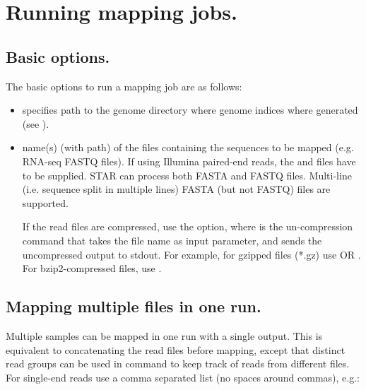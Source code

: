 \documentclass[12pt]{article}
\begin{document}
\section{Running mapping jobs.}\label{Running_mapping_jobs}
\subsection{Basic options.}
The basic options to run a mapping job are as follows:

\begin{itemize}
\item[]

 specifies path to the genome directory where genome indices where generated (see ).

\item[]
 name(s) (with path) of the files containing the sequences to be mapped (e.g. RNA-seq FASTQ files). If using Illumina paired-end reads, the  and  files have to be supplied. STAR can process both FASTA and FASTQ files. Multi-line (i.e. sequence split in multiple lines) FASTA (but not FASTQ) files are supported.

If the read files are compressed, use the   option, where  is the un-compression command that takes the file name as input parameter, and sends the uncompressed output to stdout. For example, for gzipped files (*.gz) use
OR
.
For bzip2-compressed files, use
.

\end{itemize}

\subsection{Mapping multiple files in one run.}
Multiple samples can be mapped in one run with a single output. This is equivalent to concatenating the read files before mapping, except that distinct read groups can be used in  command to keep track of reads from different files. For single-end reads use a comma separated list (no spaces around commas), e.g.:
\end{document}
